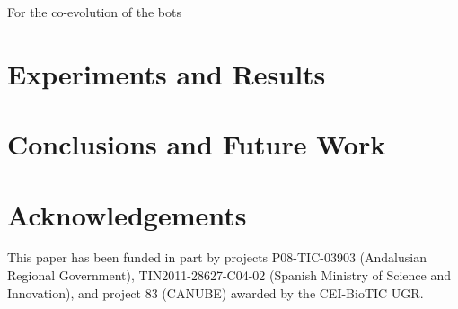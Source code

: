 \documentclass{llncs}
\begin{document}
\label{sec:fitness}


For the co-evolution of the bots 

%
%
\section{Experiments and Results}
\label{sec:experiments}


%
\section{Conclusions and Future Work}
\label{sec:conclusions}




\section*{Acknowledgements}

This paper has been funded in part by projects P08-TIC-03903 (Andalusian Regional Government), TIN2011-28627-C04-02 (Spanish Ministry of Science and Innovation), and project 83 (CANUBE) awarded by the CEI-BioTIC UGR.



\end{document}
